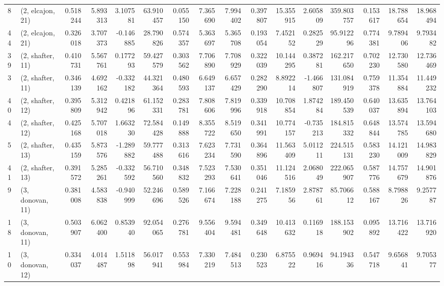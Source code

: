 \begin{tabular}{llrrrrrrrrrrrrrr}
8  &  (2, elcajon, 21) &   0.518244 &   5.893313 &  3.107581 &   63.910457 &  0.055150 &   7.365690 &   7.994402 &  0.397807 &  15.355915 &   2.605809 &  359.803757 &  0.153617 &  18.788654 &  18.968494 \\
44 &  (2, elcajon, 21) &   0.326018 &   3.707373 & -0.146885 &   28.790826 &  0.574357 &   5.363697 &   5.365708 &  0.193054 &   7.452152 &   0.282529 &   95.912296 &  0.774381 &   9.789406 &   9.793482 \\
39 &  (2, shafter, 11) &   0.410731 &   5.567761 &  0.177293 &   59.427579 &  0.303562 &   7.706890 &   7.708929 &  0.322039 &  10.144295 &   0.387281 &  162.217650 &  0.702230 &  12.730580 &  12.736469 \\
3  &  (2, shafter, 11) &   0.346139 &   4.692162 & -0.332182 &   44.321364 &  0.480593 &   6.649137 &   6.657429 &  0.282290 &   8.892214 &  -1.466807 &  131.084919 &  0.759378 &  11.354884 &  11.449232 \\
40 &  (2, shafter, 12) &   0.395809 &   5.312942 &  0.421896 &   61.152331 &  0.283781 &   7.808606 &   7.819996 &  0.339918 &  10.708854 &   1.874284 &  189.450539 &  0.640037 &  13.635894 &  13.764103 \\
4  &  (2, shafter, 12) &   0.425168 &   5.707018 &  1.663230 &   72.584428 &  0.149888 &   8.355722 &   8.519650 &  0.341991 &  10.774157 &  -0.735213 &  184.815332 &  0.648844 &  13.574785 &  13.594680 \\
5  &  (2, shafter, 13) &   0.435159 &   5.873576 & -1.289882 &   59.777488 &  0.313616 &   7.623234 &   7.731590 &  0.364896 &  11.563409 &   5.011211 &  224.515131 &  0.583230 &  14.121009 &  14.983829 \\
41 &  (2, shafter, 13) &   0.391572 &   5.285261 & -0.332592 &   56.710560 &  0.348832 &   7.523293 &   7.530641 &  0.351046 &  11.124516 &   2.068049 &  222.065907 &  0.587776 &  14.757679 &  14.901876 \\
9  &  (3, donovan, 11) &   0.381008 &   4.583838 & -0.940999 &   52.246696 &  0.589526 &   7.166674 &   7.228188 &  0.241275 &   7.185956 &   2.878761 &   85.706612 &  0.588167 &   8.798826 &   9.257787 \\
18 &  (3, donovan, 11) &   0.503907 &   6.062400 &  0.853940 &   92.054065 &  0.276781 &   9.556404 &   9.594481 &  0.349648 &  10.413632 &   0.116918 &  188.153902 &  0.095892 &  13.716422 &  13.716920 \\
10 &  (3, donovan, 12) &   0.334037 &   4.014487 &  1.511898 &   56.017941 &  0.553984 &   7.330219 &   7.484513 &  0.230523 &   6.875522 &   0.969416 &   94.194336 &  0.547718 &   9.656841 &   9.705377 \\

\end{tabular}
